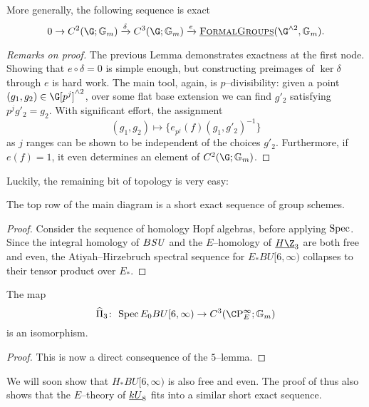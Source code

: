\begin{lemma}
More generally, the following sequence is exact \[0 \to C^2(\G; \Gm) \xrightarrow\delta C^3(\G; \Gm) \xrightarrow{e} \InternalHom{FormalGroups}(\G^{\sm 2}, \Gm).\]
\end{lemma}
\begin{proof}[Remarks on proof]
The previous Lemma demonstrates exactness at the first node.  Showing that $e \circ \delta = 0$ is simple enough, but constructing preimages of $\ker \delta$ through $e$ is hard work.  The main tool, again, is $p$--divisibility: given a point $(g_1, g_2) \in \G[p^j]^{\sm 2}$, over some flat base extension we can find $g'_2$ satisfying $p^j g'_2 = g_2$.  With significant effort, the assignment \[(g_1, g_2) \mapsto \{e_{p^j}(f)(g_1, g'_2)^{-1}\}\] as $j$ ranges can be shown to be independent of the choices $g'_2$.  Furthermore, if $e(f) = 1$, it even determines an element of $C^2(\G; \Gm)$.
\end{proof}

Luckily, the remaining bit of topology is very easy:

\begin{lemma}\label{ASTopologyExactSequence}
The top row of the main diagram is a short exact sequence of group schemes.
\end{lemma}
\begin{proof}
Consider the sequence of homology Hopf algebras, before applying $\operatorname{Spec}$.  Since the integral homology of $B\mathit{SU}$ and the $E$--homology of $\OS{H\Z}{3}$ are both free and even, the Atiyah--Hirzebruch spectral sequence for $E_* BU[6, \infty)$ collapses to their tensor product over $E_*$.
\end{proof}

\begin{corollary}
The map \[\widehat \Pi_3\co \Spec E_0 BU[6, \infty) \to C^3(\CP^\infty_E; \Gm)\] is an isomorphism.
\end{corollary}
\begin{proof}
This is now a direct consequence of the $5$--lemma.
\end{proof} 

\begin{remark}
We will soon show that $H_* BU[6, \infty)$ is also free and even.  The proof of  thus also shows that the $E$--theory of $\underline{\smash{kU}}_{8}$ fits into a similar short exact sequence.
\end{remark}

